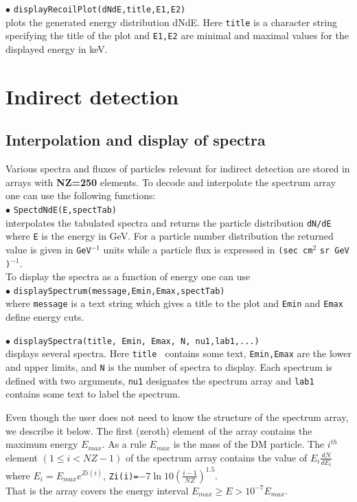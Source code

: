 \documentclass[12pt,a4paper]{article}
\begin{document}
\noindent
$\bullet$ \verb|displayRecoilPlot(dNdE,title,E1,E2)|\\
plots the  generated energy distribution dNdE. Here \verb|title|
is a character string specifying the title of the plot and
\verb|E1,E2| are minimal and maximal values for the displayed
energy in keV.

\section{Indirect detection}




\subsection{Interpolation and display of spectra}
Various spectra and fluxes  of particles  relevant for indirect detection are stored in
arrays with {\bf NZ=250} elements. To decode and interpolate the spectrum array
one can use the following functions:\\
$\bullet$  \verb|SpectdNdE(E,spectTab)|\\
interpolates the tabulated spectra  and returns the 
particle distribution \verb|dN/dE|  where \verb|E| is the energy  in GeV. 
For a particle number  distribution the returned value is given in \verb|GeV|$^{-1}$
units while  a particle flux is expressed in \verb|(sec cm|$^2$ \verb|sr GeV )|$^{-1}$.\\
To display the  spectra  as a function of energy one can use \\
$\bullet$ \verb|displaySpectrum(message,Emin,Emax,spectTab)|\\
where  \verb|message| is a text string which gives a title to the  
plot and  \verb|Emin| and \verb|Emax| define  energy cuts.

\noindent
$\bullet$ \verb|displaySpectra(title, Emin, Emax, N, nu1,lab1,...)|\\
displays several spectra. Here {\tt title  } contains some text, {\tt Emin,Emax} are the lower and upper limits, and {\tt N} is the number of spectra to display.
Each spectrum is defined with  two arguments, \verb|nu1| designates the spectrum array and \verb|lab1| contains  some text to label the spectrum.


Even though the user does not need to know the structure of the  spectrum array, we describe it below.
The first (zeroth) element of the array contains the maximum energy $E_{max}$. As a rule   $E_{max}$ is the mass of the DM particle.    
The $i^{th}$ element $(1\le i < NZ-1)$ of the spectrum array contains
the value of $E_i \frac{ dN}{dE_i} $ where  $E_i=E_{max} e^{Zi(i)}$,   
\verb|Zi(i)=|$ -7 \ln 10 \left(\frac{i-1}{NZ}\right)^{1.5}$.\\
 That is the array  covers the  energy interval  $E_{max} \ge E > 10^{-7}E_{max}$. 
\end{document}

